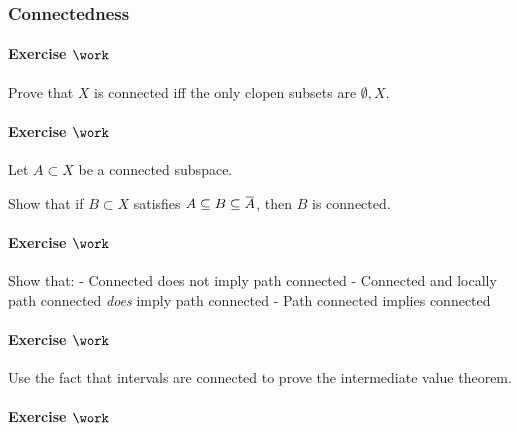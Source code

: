 \hypertarget{connectedness-1}{%
\subsubsection{Connectedness}\label{connectedness-1}}

\hypertarget{exercise-work-5}{%
\paragraph{\texorpdfstring{Exercise
\(\work\)}{Exercise \textbackslash work}}\label{exercise-work-5}}

Prove that \(X\) is connected iff the only clopen subsets are
\(\emptyset, X\).

\hypertarget{exercise-work-6}{%
\paragraph{\texorpdfstring{Exercise
\(\work\)}{Exercise \textbackslash work}}\label{exercise-work-6}}

Let \(A \subset X\) be a connected subspace.

Show that if \(B\subset X\) satisfies
\(A\subseteq B \subseteq \mkern 1.5mu\overline{\mkern-1.5muA\mkern-1.5mu}\mkern 1.5mu\),
then \(B\) is connected.

\hypertarget{exercise-work-7}{%
\paragraph{\texorpdfstring{Exercise
\(\work\)}{Exercise \textbackslash work}}\label{exercise-work-7}}

Show that: - Connected does not imply path connected - Connected and
locally path connected \emph{does} imply path connected - Path connected
implies connected

\hypertarget{exercise-work-8}{%
\paragraph{\texorpdfstring{Exercise
\(\work\)}{Exercise \textbackslash work}}\label{exercise-work-8}}

Use the fact that intervals are connected to prove the intermediate
value theorem.

\hypertarget{exercise-work-9}{%
\paragraph{\texorpdfstring{Exercise
\(\work\)}{Exercise \textbackslash work}}\label{exercise-work-9}}

